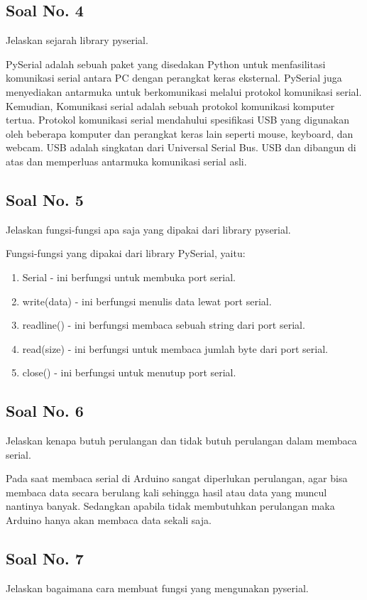 \subsection{Soal No. 4}
Jelaskan sejarah library pyserial.

\hfill \break
PySerial adalah sebuah paket yang disedakan Python untuk menfasilitasi komunikasi serial antara PC dengan perangkat keras eksternal. PySerial juga menyediakan antarmuka untuk berkomunikasi melalui protokol komunikasi serial. Kemudian, Komunikasi serial adalah sebuah protokol komunikasi komputer tertua. Protokol komunikasi serial mendahului spesifikasi USB yang digunakan oleh beberapa komputer dan perangkat keras lain seperti mouse, keyboard, dan webcam. USB adalah singkatan dari Universal Serial Bus. USB dan dibangun di atas dan memperluas antarmuka komunikasi serial asli.

\subsection{Soal No. 5}
Jelaskan fungsi-fungsi apa saja yang dipakai dari library pyserial.

\hfill \break
Fungsi-fungsi yang dipakai dari library PySerial, yaitu:
\begin{enumerate}
	\item Serial - ini berfungsi untuk membuka port serial.
	\item write(data) - ini berfungsi menulis data lewat port serial.
	\item readline() - ini berfungsi membaca sebuah string dari port serial.
	\item read(size) - ini berfungsi untuk membaca jumlah byte dari port serial.
	\item close() - ini berfungsi untuk menutup port serial.
\end{enumerate}

\subsection{Soal No. 6}
Jelaskan kenapa butuh perulangan dan tidak butuh perulangan dalam membaca serial.

\hfill \break
Pada saat membaca serial di Arduino sangat diperlukan perulangan, agar bisa membaca data secara berulang kali sehingga hasil atau data yang muncul nantinya banyak. Sedangkan apabila tidak membutuhkan perulangan maka Arduino hanya akan membaca data sekali saja.

\subsection{Soal No. 7}
Jelaskan bagaimana cara membuat fungsi yang mengunakan pyserial.

